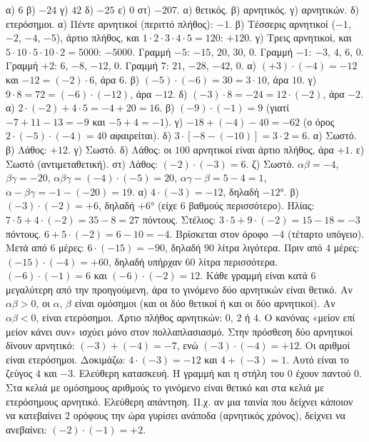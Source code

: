  α) $6$ \quad β) $-24$ \quad γ) $42$ \quad δ) $-25$ \quad ε) $0$ \quad στ) $-207$.
 α) θετικός. β) αρνητικός. γ) αρνητικών. δ) ετερόσημοι.
 α) Πέντε αρνητικοί (περιττό πλήθος): $-1$. β) Τέσσερις αρνητικοί ($-1$, $-2$, $-4$, $-5$), άρτιο πλήθος, και $1\cdot2\cdot3\cdot4\cdot5=120$: $+120$. γ) Τρεις αρνητικοί, και $5\cdot10\cdot5\cdot10\cdot2=5000$: $-5000$.
 Γραμμή $-5$: $-15$, $20$, $30$, $0$. Γραμμή $-1$: $-3$, $4$, $6$, $0$. Γραμμή $+2$: $6$, $-8$, $-12$, $0$. Γραμμή $7$: $21$, $-28$, $-42$, $0$.
 α) $(+3)\cdot(-4)=-12$ και $-12=(-2)\cdot6$, άρα $6$. β) $(-5)\cdot(-6)=30=3\cdot10$, άρα $10$. γ) $9\cdot8=72=(-6)\cdot(-12)$, άρα $-12$. δ) $(-3)\cdot8=-24=12\cdot(-2)$, άρα $-2$.
 α) $2\cdot(-2)+4\cdot5=-4+20=16$. β) $(-9)\cdot(-1)=9$ (γιατί $-7+11-13=-9$ και $-5+4=-1$). γ) $-18+(-4)-40=-62$ (ο όρος $2\cdot(-5)\cdot(-4)=40$ αφαιρείται). δ) $3\cdot[-8-(-10)]=3\cdot2=6$.
 α) Σωστό. β) Λάθος: $+12$. γ) Σωστό. δ) Λάθος: οι $100$ αρνητικοί είναι άρτιο πλήθος, άρα $+1$. ε) Σωστό (αντιμεταθετική). στ) Λάθος: $(-2)\cdot(-3)=6$. ζ) Σωστό.
 $\alpha\beta=-4$, $\beta\gamma=-20$, $\alpha\beta\gamma=(-4)\cdot(-5)=20$, $\alpha\gamma-\beta=5-4=1$, $\alpha-\beta\gamma=-1-(-20)=19$.
 α) $4\cdot(-3)=-12$, δηλαδή $-12$°. β) $(-3)\cdot(-2)=+6$, δηλαδή $+6$° (είχε $6$ βαθμούς περισσότερο).
 Ηλίας: $7\cdot5+4\cdot(-2)=35-8=27$ πόντους. Στέλιος: $3\cdot5+9\cdot(-2)=15-18=-3$ πόντους.
 $6+5\cdot(-2)=6-10=-4$. Βρίσκεται στον όροφο $-4$ (τέταρτο υπόγειο).
 Μετά από $6$ μέρες: $6\cdot(-15)=-90$, δηλαδή $90$ λίτρα λιγότερα. Πριν από $4$ μέρες: $(-15)\cdot(-4)=+60$, δηλαδή υπήρχαν $60$ λίτρα περισσότερα.
 $(-6)\cdot(-1)=6$ και $(-6)\cdot(-2)=12$. Κάθε γραμμή είναι κατά $6$ μεγαλύτερη από την προηγούμενη, άρα το γινόμενο δύο αρνητικών είναι θετικό.
 Αν $\alpha\beta>0$, οι $\alpha,\,\beta$ είναι ομόσημοι (και οι δύο θετικοί ή και οι δύο αρνητικοί). Αν $\alpha\beta<0$, είναι ετερόσημοι.
 Άρτιο πλήθος αρνητικών: $0$, $2$ ή $4$.
 Ο κανόνας «μείον επί μείον κάνει συν» ισχύει μόνο στον πολλαπλασιασμό. Στην πρόσθεση δύο αρνητικοί δίνουν αρνητικό: $(-3)+(-4)=-7$, ενώ $(-3)\cdot(-4)=+12$.
 Οι αριθμοί είναι ετερόσημοι. Δοκιμάζω: $4\cdot(-3)=-12$ και $4+(-3)=1$. Αυτό είναι το ζεύγος $4$ και $-3$.
 Ελεύθερη κατασκευή. Η γραμμή και η στήλη του $0$ έχουν παντού $0$. Στα κελιά με ομόσημους αριθμούς το γινόμενο είναι θετικό και στα κελιά με ετερόσημους αρνητικό.
 Ελεύθερη απάντηση. Π.χ. αν μια ταινία που δείχνει κάποιον να κατεβαίνει $2$ ορόφους την ώρα γυρίσει ανάποδα (αρνητικός χρόνος), δείχνει να ανεβαίνει: $(-2)\cdot(-1)=+2$.
